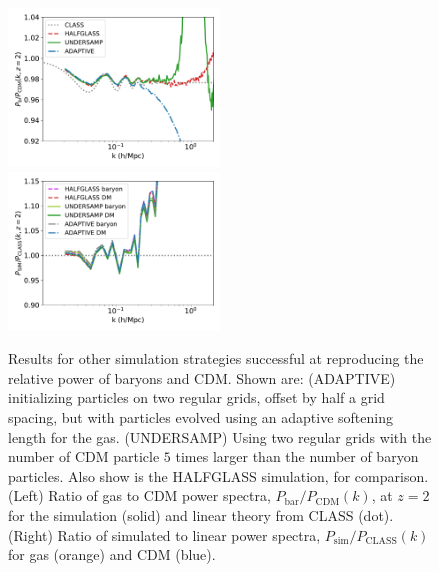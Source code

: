 \documentclass[a4paper,11pt]{article}
\begin{document}
\begin{figure}
\includegraphics[width=0.5\textwidth]{plots/oversample_2_relpower.pdf}
  \includegraphics[width=0.5\textwidth]{plots/oversample_2_class.pdf}
\caption{Results for other simulation strategies successful at reproducing the relative power of baryons and CDM. Shown are: (ADAPTIVE) initializing particles on two regular grids, offset by half a grid spacing, but with particles evolved using an adaptive softening length for the gas. (UNDERSAMP) Using two regular grids with the number of CDM particle $5$ times larger than the number of baryon particles. Also show is the HALFGLASS simulation, for comparison. (Left) Ratio of gas to CDM power spectra, $P_\mathrm{bar}/P_\mathrm{CDM}(k)$, at $z=2$ for the simulation (solid) and linear theory from CLASS (dot). (Right) Ratio of simulated to linear power spectra, $P_\mathrm{sim}/P_\mathrm{CLASS}(k)$ for gas (orange) and CDM (blue).}
  \label{fig:adaptive}
\end{figure}
\end{document}
